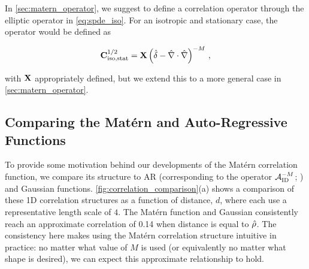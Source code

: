 
In \cref{sec:matern_operator}, we suggest to define a correlation operator through the
elliptic operator in \cref{eq:spde_iso}.
For an isotropic and stationary case, the operator would be defined as
\begin{linenomath*}\begin{equation}
    \mathbf{C}^{1/2}_\text{iso,stat} = \mathbf{X} \left(\hat{\delta} -
    \hat{\nabla}\cdot\hat{\nabla}\right)^{-M} \, ,
    \label{eq:matern_corr_isostat}
\end{equation}\end{linenomath*}
with $\mathbf{X}$ appropriately defined, but we extend this to a more general
case in \cref{sec:matern_operator}.


\subsection{Comparing the Mat\'ern and Auto-Regressive Functions}
\label{ssec:correlation_comparison}

To provide some motivation behind our developments of the Mat\'ern
correlation function, we compare its structure to AR
(corresponding to the operator $\mathcal{A}_\text{ID}^{-M}$; \citep{mirouze_representation_2010})
and Gaussian functions.
\cref{fig:correlation_comparison}(a) shows a comparison of these 1D correlation
structures as a function of distance, $d$, where each use a representative length
scale of $4$.
The Mat\'ern function and Gaussian consistently reach an approximate correlation
of 0.14 when distance is equal to $\hat{\rho}$.
The consistency here makes using the Mat\'ern correlation structure intuitive in
practice: no matter what value of $M$ is used (or equivalently no matter what
shape is desired), we can expect this approximate relationship to hold.

